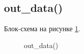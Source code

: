 \subsection{out\_data()}

Блок-схема на рисунке \ref{fig:out_data}.

\begin{figure}[p]
    \caption{out\_data()}
    \label{fig:out_data}
\end{figure}





\newpage